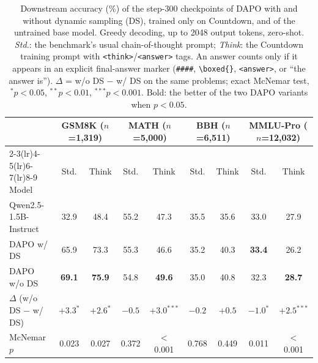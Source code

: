 \begin{table}[t]
\centering
\small
\caption{Downstream accuracy (\%) of the step-300 checkpoints of DAPO with and without dynamic sampling (DS), trained only on Countdown, and of the untrained base model. Greedy decoding, up to 2048 output tokens, zero-shot. \emph{Std.}: the benchmark's usual chain-of-thought prompt; \emph{Think}: the Countdown training prompt with \texttt{<think>}/\texttt{<answer>} tags. An answer counts only if it appears in an explicit final-answer marker (\texttt{\#\#\#\#}, \texttt{\textbackslash boxed\{\}}, \texttt{<answer>}, or ``the answer is''). $\Delta$ = w/o DS $-$ w/ DS on the same problems; exact McNemar test, $^{*}p<0.05$, $^{**}p<0.01$, $^{***}p<0.001$. Bold: the better of the two DAPO variants when $p<0.05$.}
\label{tab:downstream}
\setlength{\tabcolsep}{5pt}
\begin{tabular}{lcccccccc}
\toprule
 & \multicolumn{2}{c}{GSM8K ($n$=1,319)} & \multicolumn{2}{c}{MATH ($n$=5,000)} & \multicolumn{2}{c}{BBH ($n$=6,511)} & \multicolumn{2}{c}{MMLU-Pro ($n$=12,032)} \\
\cmidrule(lr){2-3}\cmidrule(lr){4-5}\cmidrule(lr){6-7}\cmidrule(lr){8-9}
Model & Std. & Think & Std. & Think & Std. & Think & Std. & Think \\
\midrule
Qwen2.5-1.5B-Instruct & 32.9 & 48.4 & 55.2 & 47.3 & 35.5 & 35.6 & 33.0 & 27.9 \\
DAPO w/ DS & 65.9 & 73.3 & 55.3 & 46.6 & 35.2 & 40.3 & \textbf{33.4} & 26.2 \\
DAPO w/o DS & \textbf{69.1} & \textbf{75.9} & 54.8 & \textbf{49.6} & 35.0 & 40.8 & 32.3 & \textbf{28.7} \\
\midrule
$\Delta$ (w/o DS $-$ w/ DS) & $+3.3^{*}$ & $+2.6^{*}$ & $-0.5$ & $+3.0^{***}$ & $-0.2$ & $+0.5$ & $-1.0^{*}$ & $+2.5^{***}$ \\
McNemar $p$ & 0.023 & 0.027 & 0.372 & $<$0.001 & 0.768 & 0.449 & 0.011 & $<$0.001 \\
\bottomrule
\end{tabular}
\end{table}
